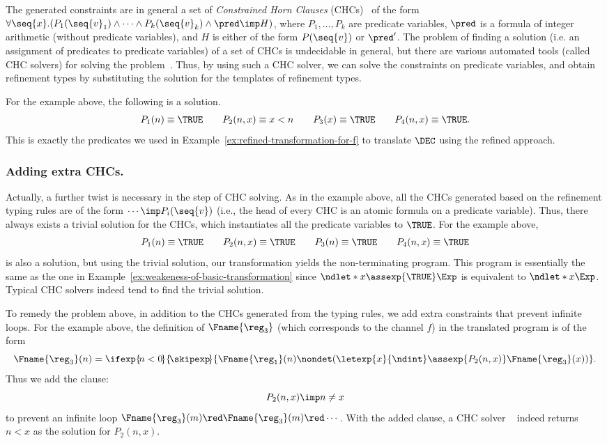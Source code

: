 The generated constraints are in general a set of \emph{Constrained Horn Clauses}
(CHCs)~\cite{Bjorner15} of the form
\(\forall \seq{x}.( P_1(\seq{v}_1)\land \cdots \land P_k(\seq{v}_k)\land \pred \imp H)\),
where \(P_1,\ldots,P_k\) are predicate variables, \(\pred\) is a formula
of integer arithmetic (without predicate variables),
and \(H\) is either of the form \(P(\seq{v})\) or \(\pred'\).
The problem of finding a solution (i.e. an assignment of predicates to
predicate variables) of a set of CHCs is undecidable in general,
but there are various automated tools (called CHC solvers)
for solving the problem~\cite{DBLP:journals/fmsd/KomuravelliGC16,DBLP:journals/jar/ChampionCKS20}.
Thus, by using such a CHC solver, we can solve the constraints on predicate variables,
and obtain refinement types by substituting the solution for the templates of
refinement types.

For the example above, the following is a solution.
\[
\begin{array}{l}
  P_1(n)\equiv \TRUE\qquad P_2(n,x)\equiv x < n\qquad 
P_3(x) \equiv \TRUE \qquad P_4(n,x)\equiv \TRUE.
\end{array}
\]
This is exactly the predicates we used in Example~\ref{ex:refined-transformation-for-f} to translate \( \DEC \) using the refined approach.

\subsubsection*{Adding extra CHCs.}
Actually, a further twist is necessary in the step of CHC solving.
As in the example above, all the CHCs generated based on the refinement typing rules
are of the form \(\cdots \imp P_i(\seq{v})\) (i.e., the head of every CHC is
an atomic formula on a predicate variable).
Thus, there always exists a trivial solution for the CHCs, which instantiates
all the predicate variables to \(\TRUE\).
For the example above,
\[
\begin{array}{l}
  P_1(n)\equiv \TRUE\qquad P_2(n,x)\equiv \TRUE\qquad 
P_3(n) \equiv \TRUE \qquad P_4(n,x)\equiv \TRUE
\end{array}
\]
is also a solution,
but using the trivial solution,
our transformation yields the non-terminating program.
This program is essentially the same as the one in Example~\ref{ex:weakeness-of-basic-transformation} since \( \ndlet*{x}{\assexp{\TRUE}}\Exp \) is equivalent to \( \ndlet*{x}\Exp \).
Typical CHC solvers indeed tend to find the trivial solution.

To remedy the problem above, in addition to the CHCs generated from the typing rules,
we add extra constraints that prevent infinite loops.
For the example above, the definition of \(\Fname{\reg_3} \) (which corresponds to the channel \( f \)) in the translated program is of the form
\[  \Fname{\reg_3}(n) = \ifexp{\!n<0\!}{\!\skipexp\!}{\Fname{\reg_1}(n) \nondet  (\letexp{x}{\ndint}\assexp{P_2(n,x)}\Fname{\reg_3}(x))}.
\]
Thus we add the clause:
\[ P_2(n,x) \imp n\ne x\]
to prevent an infinite loop \(\Fname{\reg_3}(m)\red \Fname{\reg_3}(m) \red \cdots\).
With the added clause, a CHC solver \hoice{}~\cite{DBLP:journals/jar/ChampionCKS20}
indeed returns \(n<x\) as the solution for \(P_2(n,x)\).

